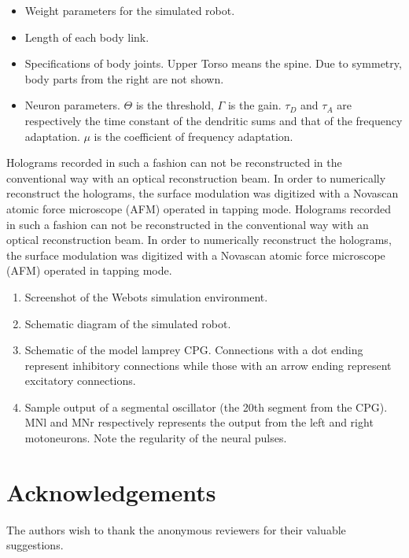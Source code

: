 \documentclass[11pt]{IEEEtran}
\begin{document}
\begin{itemize}
\item Weight parameters for the simulated robot.
\item Length of each body link.
\item Specifications of body joints. Upper Torso means the spine. Due to symmetry, body parts from the right are not shown.
\item Neuron parameters. $\Theta$ is the threshold, $\Gamma$ is the gain. $\tau_{D}$ and $\tau_{A}$ are respectively the time constant of the dendritic sums and that of the frequency adaptation. $\mu$ is the coefficient of frequency adaptation.
\end{itemize}
Holograms recorded in such a fashion can not be reconstructed in the conventional way with an optical reconstruction beam. In order to numerically reconstruct the holograms, the surface modulation was digitized with a Novascan atomic force microscope (AFM) operated in tapping mode. Holograms recorded in such a fashion can not be reconstructed in the conventional way with an optical reconstruction beam. In order to numerically reconstruct the holograms, the surface modulation was digitized with a Novascan atomic force microscope (AFM) operated in tapping mode. 
\begin{enumerate}
\item Screenshot of the Webots simulation environment.
\item Schematic diagram of the simulated robot.
\item Schematic of the model lamprey CPG. Connections with a dot ending represent inhibitory connections while those with an arrow ending represent excitatory connections.
\item Sample output of a segmental oscillator (the 20th segment from the CPG). MNl and MNr respectively represents the output from the left and right motoneurons. Note the regularity of the neural pulses.
\end{enumerate}

\section*{Acknowledgements}
The authors wish to thank the anonymous reviewers for their valuable suggestions.

\printbibliography
\end{document}
